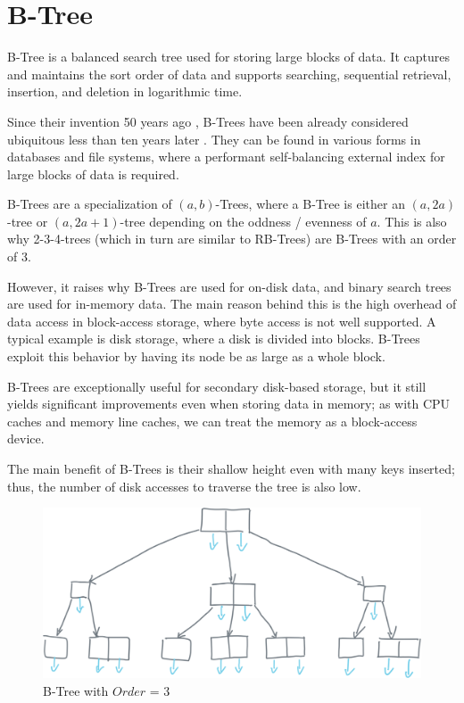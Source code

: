 \section{B-Tree}\label{section:b-tree}

B-Tree is a balanced search tree used for storing large blocks of data. It captures and maintains the sort order of data and supports searching, sequential retrieval, insertion, and deletion in logarithmic time.

Since their invention 50 years ago \cite{bayer-org}, B-Trees have been already considered ubiquitous less than ten years later \cite{10.1145/356770.356776}. They can be found in various forms in databases and file systems, where a performant self-balancing external index for large blocks of data is required.

B-Trees are a specialization of $(a,b)$-Trees, where a B-Tree is either an $(a, 2a)$-tree or $(a, 2a + 1)$-tree depending on the oddness / evenness of $a$. This is also why 2-3-4-trees (which in turn are similar to RB-Trees) are B-Trees with an order of 3.

However, it raises why B-Trees are used for on-disk data, and binary search trees are used for in-memory data. The main reason behind this is the high overhead of data access in block-access storage, where byte access is not well supported. A typical example is disk storage, where a disk is divided into blocks. B-Trees exploit this behavior by having its node be as large as a whole block.

B-Trees are exceptionally useful for secondary disk-based storage, but it still yields significant improvements even when storing data in memory; as with CPU caches and memory line caches, we can treat the memory as a block-access device.

The main benefit of B-Trees is their shallow height even with many keys inserted; thus, the number of disk accesses to traverse the tree is also low.

\begin{figure}[H]
  \centering
  \includegraphics[width=\textwidth]{components/figure/b-tree.png}
  \caption{B-Tree with $Order$ = 3}
  \label{figure:b-tree}
\end{figure}

